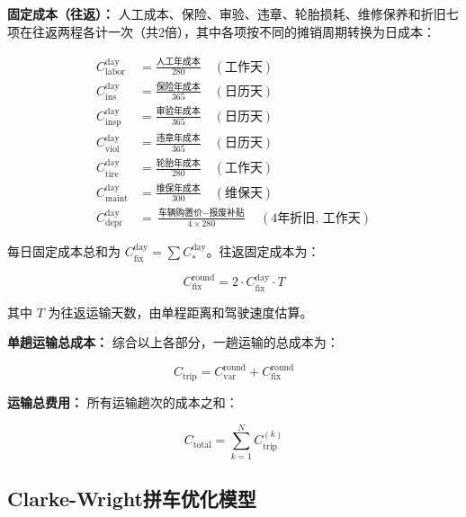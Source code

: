 \textbf{固定成本（往返）：} 人工成本、保险、审验、违章、轮胎损耗、维修保养和折旧七项在往返两程各计一次（共2倍），其中各项按不同的摊销周期转换为日成本：

\begin{equation}\label{eq:fix_items}
\begin{aligned}
C_{\mathrm{labor}}^{\mathrm{day}} &= \frac{\text{人工年成本}}{280} \quad (\text{工作天})\\
C_{\mathrm{ins}}^{\mathrm{day}} &= \frac{\text{保险年成本}}{365} \quad (\text{日历天})\\
C_{\mathrm{insp}}^{\mathrm{day}} &= \frac{\text{审验年成本}}{365} \quad (\text{日历天})\\
C_{\mathrm{viol}}^{\mathrm{day}} &= \frac{\text{违章年成本}}{365} \quad (\text{日历天})\\
C_{\mathrm{tire}}^{\mathrm{day}} &= \frac{\text{轮胎年成本}}{280} \quad (\text{工作天})\\
C_{\mathrm{maint}}^{\mathrm{day}} &= \frac{\text{维保年成本}}{300} \quad (\text{维保天})\\
C_{\mathrm{depr}}^{\mathrm{day}} &= \frac{\text{车辆购置价} - \text{报废补贴}}{4 \times 280} \quad (\text{4年折旧, 工作天})
\end{aligned}
\end{equation}

每日固定成本总和为 $C_{\mathrm{fix}}^{\mathrm{day}} = \sum C_{\mathrm{*}}^{\mathrm{day}}$。往返固定成本为：

\begin{equation}\label{eq:fix}
C_{\mathrm{fix}}^{\mathrm{round}} = 2 \cdot C_{\mathrm{fix}}^{\mathrm{day}} \cdot T
\end{equation}

其中 $T$ 为往返运输天数，由单程距离和驾驶速度估算。

\textbf{单趟运输总成本：} 综合以上各部分，一趟运输的总成本为：

\begin{equation}\label{eq:trip_cost}
C_{\mathrm{trip}} = C_{\mathrm{var}}^{\mathrm{round}} + C_{\mathrm{fix}}^{\mathrm{round}}
\end{equation}

\textbf{运输总费用：} 所有运输趟次的成本之和：

\begin{equation}\label{eq:total_cost}
C_{\mathrm{total}} = \sum_{k=1}^{N} C_{\mathrm{trip}}^{(k)}
\end{equation}

\subsection{Clarke-Wright拼车优化模型}

